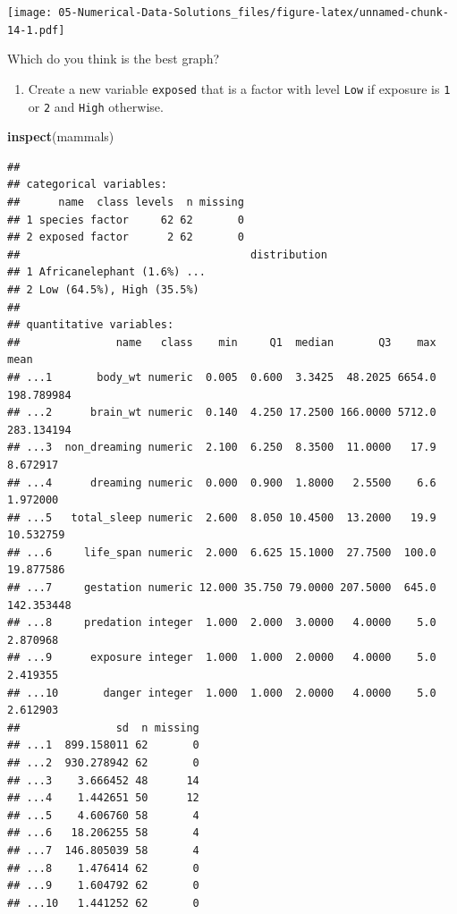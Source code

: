 \documentclass[
]{book}
\newenvironment{Shaded}{\begin{snugshade}}{\end{snugshade}}
\newcommand{\DataTypeTok}[1]{\textcolor[rgb]{0.13,0.29,0.53}{#1}}
\newcommand{\DecValTok}[1]{\textcolor[rgb]{0.00,0.00,0.81}{#1}}
\newcommand{\KeywordTok}[1]{\textcolor[rgb]{0.13,0.29,0.53}{\textbf{#1}}}
\newcommand{\NormalTok}[1]{#1}
\newcommand{\OperatorTok}[1]{\textcolor[rgb]{0.81,0.36,0.00}{\textbf{#1}}}
\newcommand{\StringTok}[1]{\textcolor[rgb]{0.31,0.60,0.02}{#1}}
\providecommand{\tightlist}{%
  \setlength{\itemsep}{0pt}\setlength{\parskip}{0pt}}
\begin{document}
\texttt{[image: 05-Numerical-Data-Solutions\_files/figure-latex/unnamed-chunk-14-1.pdf]}

Which do you think is the best graph?

\begin{enumerate}
\def\labelenumi{\alph{enumi}.}
\setcounter{enumi}{3}
\tightlist
\item
  Create a new variable \texttt{exposed} that is a factor with level \texttt{Low} if exposure is \texttt{1} or \texttt{2} and \texttt{High} otherwise.
\end{enumerate}

\begin{Shaded}
\end{Shaded}

\begin{Shaded}
\begin{Highlighting}[]
\KeywordTok{inspect}\NormalTok{(mammals)}
\end{Highlighting}
\end{Shaded}

\begin{verbatim}
## 
## categorical variables:  
##      name  class levels  n missing
## 1 species factor     62 62       0
## 2 exposed factor      2 62       0
##                                    distribution
## 1 Africanelephant (1.6%) ...                   
## 2 Low (64.5%), High (35.5%)                    
## 
## quantitative variables:  
##               name   class    min     Q1  median       Q3    max       mean
## ...1       body_wt numeric  0.005  0.600  3.3425  48.2025 6654.0 198.789984
## ...2      brain_wt numeric  0.140  4.250 17.2500 166.0000 5712.0 283.134194
## ...3  non_dreaming numeric  2.100  6.250  8.3500  11.0000   17.9   8.672917
## ...4      dreaming numeric  0.000  0.900  1.8000   2.5500    6.6   1.972000
## ...5   total_sleep numeric  2.600  8.050 10.4500  13.2000   19.9  10.532759
## ...6     life_span numeric  2.000  6.625 15.1000  27.7500  100.0  19.877586
## ...7     gestation numeric 12.000 35.750 79.0000 207.5000  645.0 142.353448
## ...8     predation integer  1.000  2.000  3.0000   4.0000    5.0   2.870968
## ...9      exposure integer  1.000  1.000  2.0000   4.0000    5.0   2.419355
## ...10       danger integer  1.000  1.000  2.0000   4.0000    5.0   2.612903
##               sd  n missing
## ...1  899.158011 62       0
## ...2  930.278942 62       0
## ...3    3.666452 48      14
## ...4    1.442651 50      12
## ...5    4.606760 58       4
## ...6   18.206255 58       4
## ...7  146.805039 58       4
## ...8    1.476414 62       0
## ...9    1.604792 62       0
## ...10   1.441252 62       0
\end{verbatim}
\end{document}
